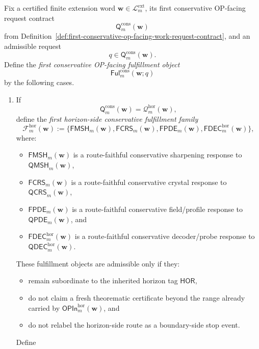 \begin{definition}
\label{def:first-conservative-op-facing-response-fulfillment-layer}
Fix a certified finite extension word \(\mathbf w\in\mathcal L^{\mathrm{ext}}_{m}\), its first conservative OP-facing request contract
\[
 \mathsf{Q}^{\mathrm{cons}}_{m}(\mathbf w)
\]
from Definition~\ref{def:first-conservative-op-facing-work-request-contract}, and an admissible request
\[
 q\in \mathsf{Q}^{\mathrm{cons}}_{m}(\mathbf w).
\]
Define the \emph{first conservative OP-facing fulfillment object}
\[
 \mathsf{Ful}^{\mathrm{cons}}_{m}(\mathbf w;q)
\]
by the following cases.
\begin{enumerate}[label=(\roman*)]
 \item If
 \[
 \mathsf{Q}^{\mathrm{cons}}_{m}(\mathbf w)=\mathcal Q^{\mathrm{hor}}_{m}(\mathbf w),
 \]
 define the \emph{first horizon-side conservative fulfillment family}
 \[
 \mathcal F^{\mathrm{hor}}_{m}(\mathbf w)
 :=
 \{\mathsf{FMSH}_{m}(\mathbf w),\mathsf{FCRS}_{m}(\mathbf w),\mathsf{FPDE}_{m}(\mathbf w),\mathsf{FDEC}^{\mathrm{hor}}_{m}(\mathbf w)\},
 \]
 where:
 \begin{itemize}[leftmargin=2em]
 \item \(\mathsf{FMSH}_{m}(\mathbf w)\) is a route-faithful conservative sharpening response to \(\mathsf{QMSH}_{m}(\mathbf w)\),
 \item \(\mathsf{FCRS}_{m}(\mathbf w)\) is a route-faithful conservative crystal response to \(\mathsf{QCRS}_{m}(\mathbf w)\),
 \item \(\mathsf{FPDE}_{m}(\mathbf w)\) is a route-faithful conservative field/profile response to \(\mathsf{QPDE}_{m}(\mathbf w)\), and
 \item \(\mathsf{FDEC}^{\mathrm{hor}}_{m}(\mathbf w)\) is a route-faithful conservative decoder/probe response to \(\mathsf{QDEC}^{\mathrm{hor}}_{m}(\mathbf w)\).
 \end{itemize}
 These fulfillment objects are admissible only if they:
 \begin{itemize}[leftmargin=2em]
 \item remain subordinate to the inherited horizon tag \(\mathsf{HOR}\),
 \item do not claim a fresh theorematic certificate beyond the range already carried by \(\mathsf{OPIn}^{\mathrm{hor}}_{m}(\mathbf w)\), and
 \item do not relabel the horizon-side route as a boundary-side stop event.
 \end{itemize}
 Define

\end{enumerate}
\end{definition}

